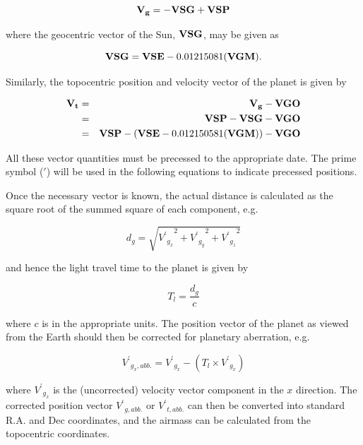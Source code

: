 \documentclass[11pt,twoside]{article}
\renewcommand{\_}{\texttt{\symbol{95}}}
\begin{document}
\begin{displaymath}
\bf{V_g} = - \bf{VSG} + \bf{VSP}
\end{displaymath}

where the geocentric vector of the Sun, $\bf{VSG}$, may be given as

\begin{displaymath}
{\bf{VSG}} = {\bf{VSE}} - 0.01215081 ({\bf{VGM}}).
\end{displaymath}

Similarly, the topocentric position and velocity vector of the planet is given by

\begin{eqnarray*}
\bf{V_t} & = & \bf{V_g} - \bf{VGO}\\
& = & \bf{VSP} - \bf{VSG} - \bf{VGO}\\
& = & {\bf{VSP}} - ({\bf{VSE}} - 0.012150581 ({\bf{VGM}})) - {\bf{VGO}}
\end{eqnarray*}

All these vector quantities must be precessed to the appropriate date. The prime symbol ($\prime$) will be used in the following equations to indicate precessed positions.

Once the necessary vector is known, the actual distance is calculated as the square root of the summed square of each component, e.g.

\begin{displaymath}
d_g = \sqrt{{{{V^\prime}_{g_x}}^2} + {{{V^\prime}_{g_y}}^2} + {{{V^\prime}_{g_z}}^2}}
\end{displaymath}

and hence the light travel time to the planet is given by

\begin{displaymath}
T_l = \frac{d_g}{c}
\end{displaymath}

where $c$ is in the appropriate units.  The position vector of the planet as viewed from the Earth should then be corrected for planetary aberration, e.g.

\begin{displaymath}
{V^\prime}_{g_x, abb.} = {V^\prime}_{g_x} - (T_l \times {V^\prime}_{g_{\dot{x}}})
\end{displaymath}

where ${V^\prime}_{g_{\dot{x}}}$ is the (uncorrected) velocity vector component in the $x$ direction.  The corrected position vector ${V^\prime}_{g, abb.}$ or ${V^\prime}_{t, abb.}$ can then be converted into standard R.A. and Dec coordinates, and the airmass can be calculated from the topocentric coordinates.
\end{document}
